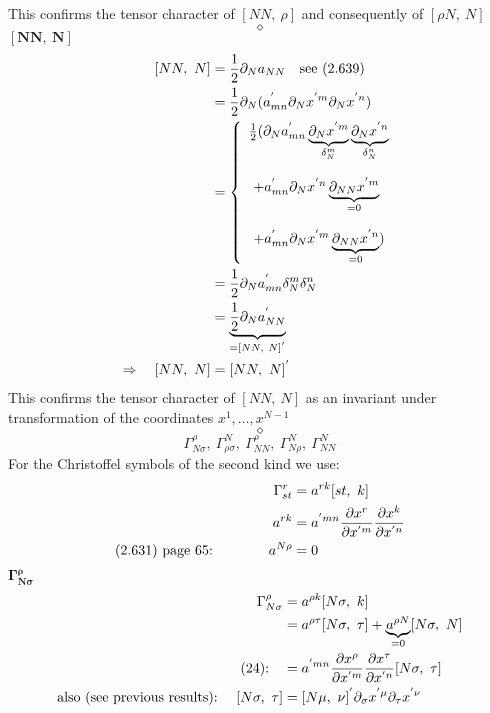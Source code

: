 This confirms the tensor character of $[ NN, \ \rho ] $ and consequently of $[\rho N, \ N ]$
$$\diamond$$
\newpage
$\boldsymbol{[NN, \ N ] }$\\
\begin{align}
\ [ NN, \ N ] &= \frac{1}{2} \partial_{N} a_{NN}\quad \text{see (2.639)}\\
\ &= \frac{1}{2} \partial_{N} (a^{'}_{mn}\partial_{N}x^{'m}\partial_{N}x^{'n})\\
\ & = \left\{ \begin{array}{l}
\frac{1}{2} (\partial_{N} a^{'}_{mn}\underbrace{\partial_{N}x^{'m}}_{\delta^m_N}\underbrace{\partial_{N}x^{'n}}_{\delta^n_N}\\\\
\ + a^{'}_{mn} \partial_{N}x^{'n} \underbrace{\partial_{N N}x^{'m}}_{=0}\\\\
\ + a^{'}_{mn} \partial_{N}x^{'m} \underbrace{\partial_{N N}x^{'n}}_{=0})
\end{array} \right.\\
\ &= \frac{1}{2} \partial_{N} a^{'}_{mn}\delta^m_N\delta^n_N\\
\ &=  \underbrace{\frac{1}{2} \partial_{N} a^{'}_{NN}}_{=[ NN, \ N ]^{'}} \\
\Rightarrow \quad [ NN, \ N ] &=  [ NN, \ N ]^{'}
\end{align}
This confirms the tensor character of $[ NN, \ N ] $ as an invariant under transformation of the coordinates $x^1, \dots , x^{N-1}$
$$\diamond$$
$$\Gamma^{\rho}_{N \sigma},\ \Gamma^{N}_{\rho \sigma},\ \Gamma^{\rho}_{N N}, \ \Gamma^{N}_{N \rho}, \ \Gamma^{N}_{N N}$$
For the Christoffel symbols of the second kind we use:
\begin{align}
\Gamma^r_{st} &= a^{rk}[st,\ k]\\
\ a^{rk} &= a^{'mn}\pdv{x^r}{x^{'m}}\pdv{x^k}{x^{'n}}\\
 \text{(2.631) page 65:}\quad\quad\quad\quad a^{N \rho} &= 0 
\end{align}
\newpage
$\boldsymbol{\Gamma^{\rho}_{N \sigma}}$\\
\begin{align}
\Gamma^{\rho}_{N \sigma} &= a^{\rho k}[N \sigma,\ k]\\
\ & = a^{\rho \tau}[N \sigma,\ \tau]+ \underbrace{a^{\rho N}}_{=0}[N \sigma,\ N]\\
\text{(24):}\quad &= a^{'mn}\pdv{x^{\rho}}{x^{'m}}\pdv{x^{\tau}}{x^{'n}}[N \sigma,\ \tau]\\
\text{also (see previous results):}\quad \ [N \sigma,\ \tau] &= [ N \mu, \ \nu]^{'}\partial_{\sigma}x^{'\mu}\partial_{\tau}x^{'\nu}
\end{align}
